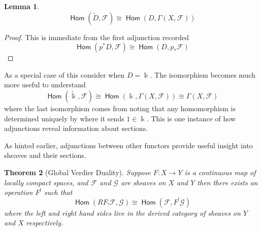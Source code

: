 \documentclass{psapm-l}
\newtheorem{theorem}{Theorem}[section]
\newtheorem{lemma}[theorem]{Lemma}
\theoremstyle{definition}
\theoremstyle{remark}
\numberwithin{equation}{section}
\begin{document}
\begin{lemma}
\[
       {{{\operatorname{\mathsf{{Hom}}}}}}(\widetilde{D},{{\mathcal F}})\cong{{{\operatorname{\mathsf{{Hom}}}}}}(D,\Gamma(X,{{\mathcal F}}))
\]
\end{lemma}
\begin{proof}
This is immediate from the first adjunction recorded
       \[
               {{{\operatorname{\mathsf{{Hom}}}}}}(p^*D,{{\mathcal F}})\cong{{{\operatorname{\mathsf{{Hom}}}}}}(D,p_*{{\mathcal F}})
       \]
\end{proof}

As a special case of this consider when $D={{\Bbbk}}$. The isomorphism becomes much more useful to understand
\[
       {{{\operatorname{\mathsf{{Hom}}}}}}(\tilde{{\Bbbk}},{{\mathcal F}})\cong{{{\operatorname{\mathsf{{Hom}}}}}}({{\Bbbk}},\Gamma(X,{{\mathcal F}}))\cong\Gamma(X,{{\mathcal F}})
\]
where the last isomorphism comes from noting that any homomorphism is determined uniquely by where it sends $1\in {{\Bbbk}}$. This is one instance of how adjunctions reveal information about sections.

As hinted earlier, adjunctions between other functors provide useful insight into sheaves and their sections.

\begin{theorem}[Global Verdier Duality]
Suppose $F\colon X\to Y$ is a continuous map of locally compact spaces, and ${{\mathcal F}}$ and $\mathcal{G}$ are sheaves on $X$ and $Y$ then there exists an operation $F^!$ such that
\[
       {{{\operatorname{\mathsf{{Hom}}}}}}(RF_!{{\mathcal F}},\mathcal{G})\cong{{{\operatorname{\mathsf{{Hom}}}}}}({{\mathcal F}},F^!\mathcal{G})
\]
where the left and right hand sides live in the derived category of sheaves on $Y$ and $X$ respectively.
\end{theorem}
\end{document}
